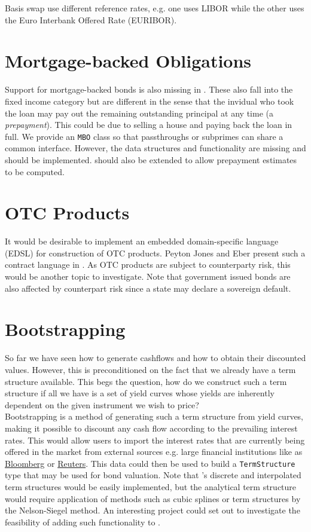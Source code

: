 Basis swap use different reference rates, e.g. one uses LIBOR while the other
uses the Euro Interbank Offered Rate (EURIBOR)\cite{HULL}.

\section{Mortgage-backed Obligations}

Support for mortgage-backed bonds is also missing in \hql. These also fall
into the fixed income category but are different in the sense that the
invidual who took the loan may pay out the remaining outstanding principal
at any time (a \emph{prepayment}). This could be due to selling a house 
and paying back the loan in full. 
We provide an \texttt{MBO} class so that passthroughs or subprimes can share a 
common interface. However, the data structures and functionality are missing 
and should be  implemented. \hql should also be extended to allow 
prepayment estimates to be computed.

\section{OTC Products}

It would be desirable to implement an embedded domain-specific language (EDSL)
for construction of OTC products. Peyton Jones and Eber present such a contract
language in \cite{composingcontracts}. As OTC products are subject to
counterparty risk, this would be another topic to investigate. Note that government
issued bonds are also affected by counterpart risk since a state may declare
a sovereign default.

\section{Bootstrapping}

So far we have seen how to generate cashflows and how to obtain their 
discounted values. However, this is preconditioned on the fact that we already 
have a term structure available. This begs the question, how do we construct 
such a term structure if all we have is a set of yield curves whose yields 
are inherently dependent on the given instrument we wish to price?\\

Bootstrapping is a method of generating such a term structure from yield 
curves, making it possible to discount any cash flow according to the 
prevailing interest rates. 
This would allow users to import the interest rates that are currently being 
offered in the market from external sources e.g. large financial institutions like
as \href{www.bloomberg.com}{Bloomberg} or \href{www.reuters.com}{Reuters}.
This data could then be used to build a \texttt{TermStructure} type 
that may be used for bond valuation. Note that \hql's discrete and interpolated 
term structures would be easily implemented, but the analytical term structure
would require application of methods such as cubic splines or term structures
by the Nelson-Siegel method. 
An interesting project could set out to investigate the feasibility of adding such 
functionality to \hql.


